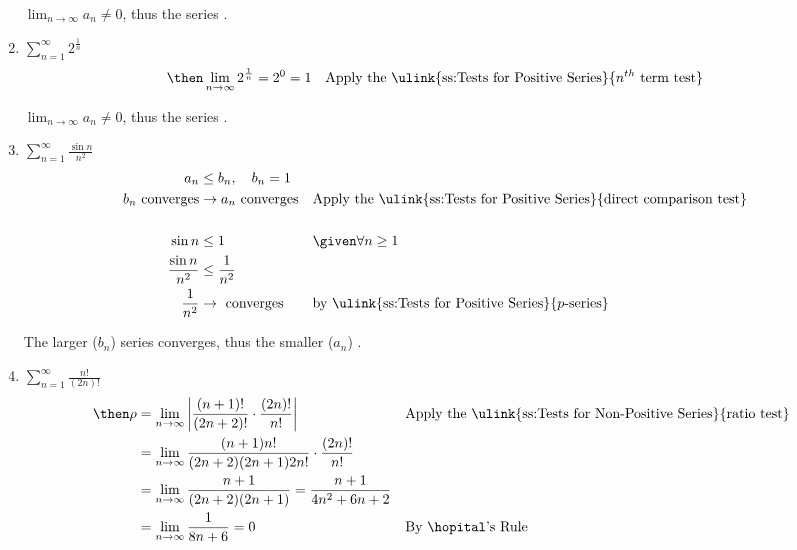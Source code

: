 \begin{enumerate}[itemsep=12em]
    \(\lim_{n \to \infty} a_n \neq 0\), thus the series .

  \vspace{-6em}
  \item \(\displaystyle \sum_{n=1}^{\infty} 2^\frac{1}{n} \)
    \begin{align*}
      &\then \lim_{n \to \infty} 2^{\frac{1}{n}} = 2^0 = 1
      && \text{Apply the \ulink{ss:Tests for Positive Series}{\(n^{th} \) term test}}
    \end{align*}

    \(\lim_{n \to \infty} a_n \neq 0\), thus the series .

  \vspace{-5em}
  \item \(\displaystyle \sum_{n=1}^{\infty} \frac{\sin n}{n^2} \)
    \begin{align*}
      a_n &\leq b_n, \quad b_n = 1 \\
      b_n ~\text{converges} &\to a_n ~\text{converges}
          && \text{Apply the \ulink{ss:Tests for Positive Series}{direct comparison test}} \\\\
      \sin  n &\leq 1 && \given \forall n \geq 1 \\
      \frac{\sin n}{n^2} &\leq \frac{1}{n^2} \\
      \frac{1}{n^2} &\to ~\text{converges}
      && \text{by \ulink{ss:Tests for Positive Series}{\(p\)-series}}
    \end{align*}

    The larger (\(b_n\)) series converges, thus the smaller (\(a_n\)) .

  \vspace{-16pt}
  \item \(\displaystyle \sum_{n=1}^{\infty} \frac{n!}{(2n)!} \)
    \begin{align*}
      \then \rho &= \lim_{n \to \infty} \left|
     \frac{(n+1)!}{(2n+2)!} \cdot \frac{(2n)!}{n!} \right|
     && \text{Apply the \ulink{ss:Tests for Non-Positive Series}{ratio test}} \\
     &=\lim_{n \to \infty}
     \frac{(n+1)n!}{(2n+2)(2n+1)2n!} \cdot \frac{(2n)!}{n!} \\
     &=\lim_{n \to \infty}
     \frac{n+1}{(2n+2)(2n+1)} =
     \frac{n+1}{4n^2+6n+2} \\
     &=\lim_{n \to \infty} \frac{1}{8n + 6} = 0
     && \text{By \hopital's Rule} \\
    \end{align*}


\end{enumerate}
